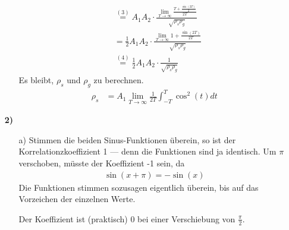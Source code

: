 \documentclass[a4paper,11pt]{article}
\begin{document}
\begin{enumerate}
\begin{enumerate}
\begin{align*}
								  &\overset{(3)}{=} A_1A_2 \cdot \frac{\displaystyle \lim_{T \to \infty} \frac{T + \frac{\sin(2T)}{2}}{2T}}{\sqrt{\rho_s\rho_g}} \\
								  &= \frac{1}{2} A_1A_2 \cdot \frac{\displaystyle \lim_{T \to \infty} 1 + \frac{\sin(2T)}{2T}}{\sqrt{\rho_s\rho_g}} \\
								  &\overset{(4)}{=} \frac{1}{2}A_1A_2 \cdot \frac{1}{\sqrt{\rho_s\rho_g}}
					\end{align*}
					Es bleibt, $\rho_s$ und $\rho_g$ zu berechnen.
					\begin{align*}
						\rho_s &= A_1 \lim_{T \to \infty} \frac{1}{2T} \int_{-T}^T \cos^2(t) dt
					\end{align*}
			\end{enumerate}

		\item[\textbf{2)}]
			\begin{enumerate}
				\item[a)]
					Stimmen die beiden Sinus-Funktionen überein, so ist der
					Korrelationzkoeffizient 1 --- denn die Funktionen sind ja
					identisch. Um $\pi$ verschoben, müsste der Koeffizient -1
					sein, da
					\begin{align*}
					\sin(x + \pi) = -\sin(x)
					\end{align*}
					Die Funktionen stimmen sozusagen eigentlich überein,
					bis auf das Vorzeichen der einzelnen Werte.

					Der Koeffizient ist (praktisch) 0 bei einer Verschiebung
					von $\frac{\pi}{2}$.
			\end{enumerate}
	\end{enumerate}
\end{document}
